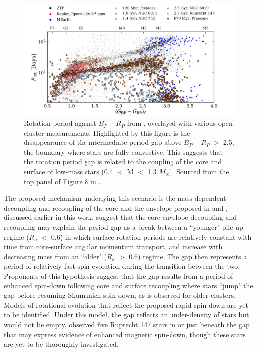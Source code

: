 \begin{figure}[h]
    \includegraphics[width=\textwidth]{Figures/intro_figures/ztf_comp.png}
    \caption[Rotation period distribution including fully convective stars.]{Rotation period against \gaia{} $B_P - R_P$ from \kepler{}, \ZTF{} overlayed with various open cluster measurements. Highlighted by this figure is the disappearance of the intermediate period gap above $B_P-R_P \ >$ 2.5, the boundary where stars are fully convective. This suggests that the rotation period gap is related to the coupling of the core and surface of low-mass stars (0.4 $<$ M $<$ 1.3 $M_{\odot}$). Sourced from the top panel of Figure 8 in \citet{lu_bridging_2022}.}
    \label{fig:ztf_comp}
\end{figure}

The proposed mechanism underlying this scenario is the mass-dependent decoupling and recoupling of the core and the envelope proposed in \citet{lanzafame_rotational_2015} and \citet{spada_competing_2020}, discussed earlier in this work.
\citet{angus_exploring_2020} suggest that the core envelope decoupling and recoupling may explain the period gap as a break between a ``younger" pile-up regime ($R_o$ $<$ 0.6) in which surface rotation periods are relatively constant with time from core-surface angular momentum transport, and increase with decreasing mass from an ``older" ($R_o$ $>$ 0.6) regime.
The gap then represents a period of relatively fast spin evolution during the transition between the two.
Proponents of this hypothesis suggest that the gap results from a period of enhanced spin-down following core and surface recoupling where stars ``jump" the gap before resuming Skumanich spin-down, as is observed for older clusters.
Models of rotational evolution  that reflect the proposed rapid spin-down are yet to be identified.
Under this model, the gap reflects an under-density of stars but would not be empty.
\citet{curtis_when_2020} observed five Ruprecht 147 stars in or just beneath the gap that may express evidence of enhanced magnetic spin-down, though these stars are yet to be thoroughly investigated.


